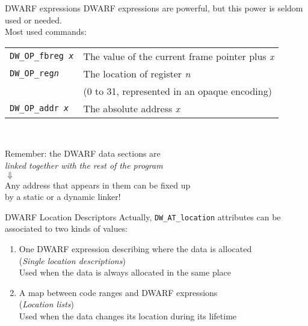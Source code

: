 \begin{frame}{DWARF expressions}
DWARF expressions are powerful, but this power is seldom used or needed.\\
\smallskip
Most used commands:\\
\medskip
\begin{tabular}{ l l }
\texttt{DW\_OP\_fbreg \textit{x}} & The value of the current frame pointer plus \textit{x} \\
\texttt{DW\_OP\_reg\textit{n}} & The location of register \textit{n} \\
& (0 to 31, represented in an opaque encoding) \\
\texttt{DW\_OP\_addr \textit{x}} & The absolute address \textit{x} \\
\end{tabular}\\
\bigskip
\begin{center}
Remember: the DWARF data sections are\\\emph{linked together with the rest of the program}\\
$\Downarrow$\\
Any address that appears in them can be fixed up\\by a static or a dynamic linker!
\end{center}
\end{frame}


\begin{frame}{DWARF Location Descriptors}
Actually, \texttt{DW\_AT\_location} attributes can be associated to two kinds of values:\\
\medskip
\begin{enumerate}
\item One DWARF expression describing where the data is allocated\\
	(\emph{Single location descriptions})\\ \smallskip
	Used when the data is always allocated in the same place
\medskip
\item A map between code ranges and DWARF expressions\\
	(\emph{Location lists})\\ \smallskip
	Used when the data changes its location during its lifetime
\end{enumerate}
\end{frame}


